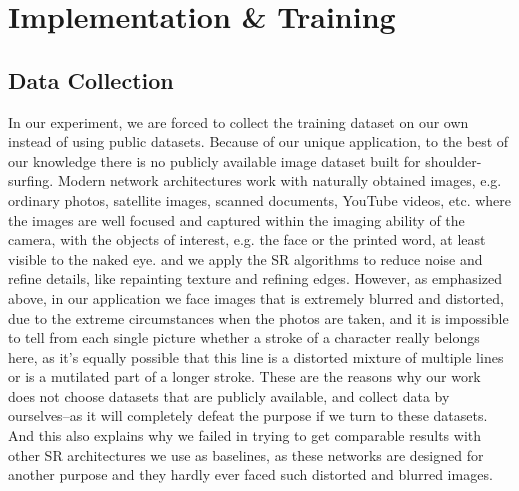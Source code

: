 \section{Implementation \& Training}
\label{sec-implementation-and-training}

\subsection{Data Collection}
\label{sec-experiment-setting}

In our experiment, we are forced to collect the training dataset on our own instead of using public datasets. Because of our unique application, to the best of our knowledge there is no publicly available image dataset built for shoulder-surfing. Modern network architectures work with naturally obtained images, e.g. ordinary photos, satellite images, scanned documents, YouTube videos, etc. where the images are well focused and captured within the imaging ability of the camera, with the objects of interest, e.g. the face or the printed word, at least visible to the naked eye. and we apply the SR algorithms to reduce noise and refine details, like repainting texture and refining edges. However, as emphasized above, in our application we face images that is extremely blurred and distorted, due to the extreme circumstances when the photos are taken, and it is impossible to tell from each single picture whether a stroke of a character really belongs here, as it's equally possible that this line is a distorted mixture of multiple lines or is a mutilated part of a longer stroke. These are the reasons why our work does not choose datasets that are publicly available, and collect data by ourselves--as it will completely defeat the purpose if we turn to these datasets. And this also explains why we failed in trying to get comparable results with other SR architectures we use as baselines, as these networks are designed for another purpose and they hardly ever faced such distorted and blurred images.

